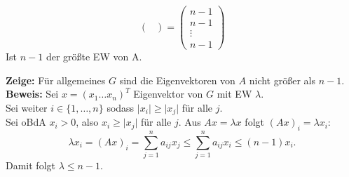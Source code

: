 \begin{problem*}[3]
\begin{equation*}
\begin{pmatrix}
   \end{pmatrix} = 
   \begin{pmatrix}
   n-1 \\
   n-1 \\
   \vdots \\
   n-1
     
   \end{pmatrix}
 \end{equation*}
 Ist $ n-1 $ der größte EW von A.
\end{problem*}

\begin{problem*}[3b]
\textbf{Zeige:} Für allgemeines $ G $ sind die Eigenvektoren von $ A $ nicht größer als $ n-1 $. \\
\textbf{Beweis:} Sei $ x = (x_1 \dots x_n)^{ T }$ Eigenvektor von $ G $ mit EW $ \lambda $.\\
Sei weiter $i \in \{ 1, \dots, n \} $ sodass $ \vert x_i \vert \geq \vert x_j \vert$ für alle $ j $.\\
Sei oBdA $ x_i > 0 $, also $ x_i \geq \vert x_j \vert$ für alle $ j $.
Aus $ Ax = \lambda x$ folgt $ (Ax)_i = \lambda x_i$:
\begin{equation*}
  \lambda x_i = (Ax)_i = \sum_{ j=1 }^{ n } a_{ ij }x_j \leq \sum_{ j=1 }^{ n } a_{ ij }x_i \leq (n-1)x_i.
\end{equation*}
Damit folgt $ \lambda \leq n-1 $.
\end{problem*}

